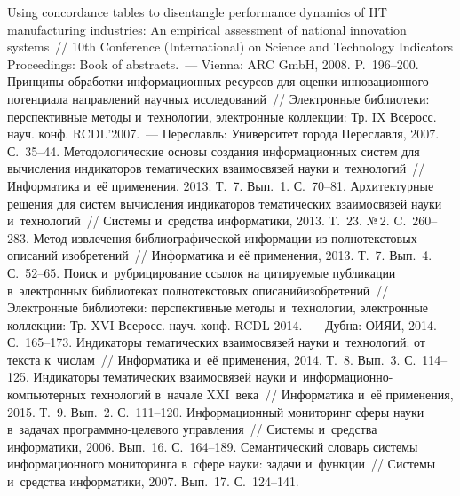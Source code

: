 \begin{multicols}{2}
{{\begin{thebibliography}{99}
 Using concordance tables to 
disentangle performance dynamics of HT manufacturing industries:
An empirical assessment of 
national innovation systems~//  10th Conference (International) on Science and Technology 
Indicators Proceedings: Book of abstracts.~--- Vienna: ARC GmbH, 2008.  
P.~196--200.
 Принципы обработки информационных ресурсов для 
оценки инновационного потенциала направлений научных исследований~// Электронные 
библиотеки: перспективные методы и~технологии, электронные коллекции: Тр. IX Всеросс. 
науч. конф. RCDL'2007.~--- Переславль: Университет города Переславля, 2007. С.~35--44.
 Методологические 
основы создания информационных систем для вычисления индикаторов тематиче\-ских 
взаимосвязей науки и~технологий~// Информатика и~её применения, 2013. Т.~7. Вып.~1. 
С.~70--81.
 Архитектурные 
решения для систем вы\-чис\-ле\-ния индикаторов тематических взаимосвязей науки 
и~технологий~// Системы и~средства информатики, 2013. Т.~23. №\,2. C.~260--283.
 Метод извлечения 
библиографической информации из полнотекстовых описаний изобретений~// Информатика 
и её применения, 2013. Т.~7. Вып.~4. С.~52--65.
 Поиск и~рубрицирование ссылок на цитируемые 
публикации в~электронных библиотеках полнотекстовых описаний\linebreak изобретений~// 
Электронные библиотеки: перспективные методы и~технологии, электронные коллекции: 
Тр. XVI Всеросс. науч. конф. RCDL-2014.~---  Дубна: \mbox{ОИЯИ}, 2014. С.~165--173.
 Индикаторы 
тематических взаимосвязей науки и~технологий: от текста к~числам~// Информатика и~её 
применения, 2014. Т.~8. Вып.~3. С.~114--125.
 Индикаторы 
тематических взаимосвязей науки и~информационно-компьютерных технологий в~начале 
XXI~века~// Информатика и~её применения, 2015. Т.~9. Вып.~2. С.~111--120.
 Информационный мониторинг сферы науки в~задачах 
программно-це\-ле\-во\-го управления~// Системы и~средства информатики, 2006. 
Вып.~16. С.~164--189.
 Семантический словарь системы информационного 
мониторинга в~сфере науки: задачи и~функции~// Системы и~средства информатики, 2007. Вып.~17. С.~124--141.


\end{thebibliography}}}
\end{multicols}
